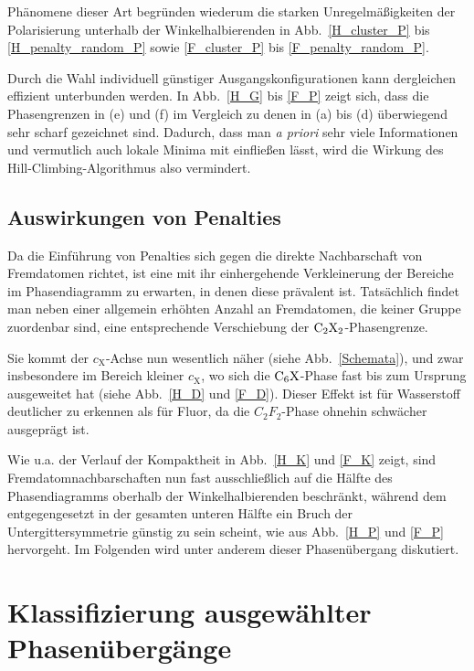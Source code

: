 \documentclass[a4paper, 10pt, twoside, openany]{book} %
\def \cX {c_\mathrm{X}}
\begin{document}
Phänomene dieser Art begründen wiederum die starken Unregelmäßigkeiten der Polarisierung unterhalb der Winkelhalbierenden in Abb.~\ref{H_cluster_P} bis \ref{H_penalty_random_P} sowie \ref{F_cluster_P} bis \ref{F_penalty_random_P}.

Durch die Wahl individuell günstiger Ausgangskonfigurationen kann dergleichen effizient unterbunden werden. In Abb.~\ref{H_G} bis \ref{F_P} zeigt sich, dass die Phasengrenzen in (e) und (f) im Vergleich zu denen in (a) bis (d) überwiegend sehr scharf gezeichnet sind. Dadurch, dass man \emph{a priori} sehr viele Informationen und vermutlich auch lokale Minima mit einfließen lässt, wird die Wirkung des Hill-Climbing-Algorithmus also vermindert.

\subsection{Auswirkungen von Penalties}

Da die Einführung von Penalties sich gegen die direkte Nachbarschaft von Fremdatomen richtet, ist eine mit ihr einhergehende Verkleinerung der Bereiche im Phasendiagramm zu erwarten, in denen diese prävalent ist. Tatsächlich findet man neben einer allgemein erhöhten Anzahl an Fremdatomen, die keiner Gruppe zuordenbar sind, eine entsprechende Verschiebung der $\rm C_2X_2$-Phasengrenze.

Sie kommt der $\cX$-Achse nun wesentlich näher (siehe Abb.~\ref{Schemata}), und zwar insbesondere im Bereich kleiner $\cX$, wo sich die $\rm C_6X$-Phase fast bis zum Ursprung ausgeweitet hat (siehe Abb.~\ref{H_D} und \ref{F_D}). Dieser Effekt ist für Wasserstoff deutlicher zu erkennen als für Fluor, da die $C_2F_2$-Phase ohnehin schwächer ausgeprägt ist.

Wie u.a. der Verlauf der Kompaktheit in Abb.~\ref{H_K} und \ref{F_K} zeigt, sind Fremdatomnachbarschaften nun fast ausschließlich auf die Hälfte des Phasendiagramms oberhalb der Winkelhalbierenden beschränkt, während dem entgegengesetzt in der gesamten unteren Hälfte ein Bruch der Untergittersymmetrie günstig zu sein scheint, wie aus Abb.~\ref{H_P} und \ref{F_P} hervorgeht. Im Folgenden wird unter anderem dieser Phasenübergang diskutiert.

\section{Klassifizierung ausgewählter Phasenübergänge}
\label{Klassifizierung ausgewaehlter Phasenuebergaenge}
\end{document}
